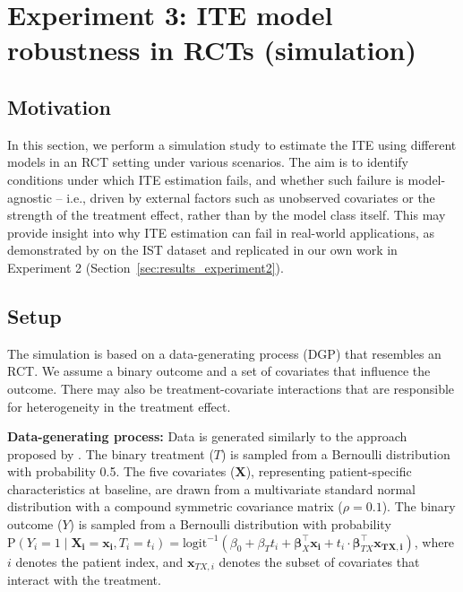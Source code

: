





\chapter{Experiment 3: ITE model robustness in RCTs (simulation)} \label{ch:experiment3}




\section{Motivation}

In this section, we perform a simulation study to estimate the ITE using different models in an RCT setting under various scenarios. The aim is to identify conditions under which ITE estimation fails, and whether such failure is model-agnostic -- i.e., driven by external factors such as unobserved covariates or the strength of the treatment effect, rather than by the model class itself. This may provide insight into why ITE estimation can fail in real-world applications, as demonstrated by \citet{chen2025} on the IST dataset and replicated in our own work in Experiment 2 (Section~\ref{sec:results_experiment2}). 


\section{Setup} \label{sec:methods_experiment3}

The simulation is based on a data-generating process (DGP) that resembles an RCT. We assume a binary outcome and a set of covariates that influence the outcome. There may also be treatment-covariate interactions that are responsible for heterogeneity in the treatment effect.

\medskip

\textbf{Data-generating process:} Data is generated similarly to the approach proposed by \citet{hoogland2021}. The binary treatment ($T$) is sampled from a Bernoulli distribution with probability 0.5. The five covariates ($\mathbf{X}$), representing patient-specific characteristics at baseline, are drawn from a multivariate standard normal distribution with a compound symmetric covariance matrix ($\rho=0.1$). The binary outcome ($Y$) is sampled from a Bernoulli distribution with probability $\text{P}(Y_i = 1 \mid  \mathbf{X_i} = \mathbf{x_i}, T_i = t_i) = \text{logit}^{-1} \left(\beta_0 + \beta_T t_i + \boldsymbol{\beta}_X^\top \mathbf{x_i} + t_i \cdot \boldsymbol{\beta}_{TX}^\top \mathbf{x_{TX,i}} \right)$, where $i$ denotes the patient index, and $\mathbf{x}_{TX,i}$ denotes the subset of covariates that interact with the treatment.

